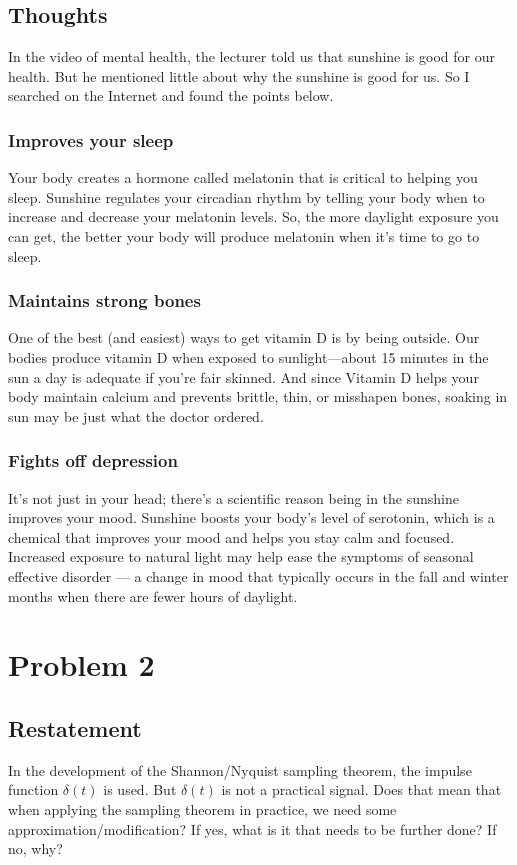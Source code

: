 \documentclass{article}
\begin{document}
\subsection{Thoughts}

In the video of mental health, the lecturer told us that sunshine is good for
our health. But he mentioned little about why the sunshine is good for us. So
I searched on the Internet and found the points below.

\subsubsection*{Improves your sleep}

Your body creates a hormone called melatonin that is critical to helping you
sleep. Sunshine regulates your circadian rhythm by telling your body when to
increase and decrease your melatonin levels. So, the more daylight exposure
you can get, the better your body will produce melatonin when it's time to go
to sleep.

\subsubsection*{Maintains strong bones} One of the best (and easiest) ways to
 get vitamin D is by being outside. Our bodies produce vitamin D when exposed
 to sunlight—about 15 minutes in the sun a day is adequate if you're fair
 skinned. And since Vitamin D helps your body maintain calcium and prevents
 brittle, thin, or misshapen bones, soaking in sun may be just what the
 doctor ordered.

\subsubsection*{Fights off depression} It's not just in your head; there's a
 scientific reason being in the sunshine improves your mood. Sunshine boosts
 your body's level of serotonin, which is a chemical that improves your mood
 and helps you stay calm and focused. Increased exposure to natural light may
 help ease the symptoms of seasonal effective disorder --- a change in mood
 that typically occurs in the fall and winter months when there are fewer
 hours of daylight.


\section{Problem 2}

\subsection{Restatement} In the development of the Shannon/Nyquist sampling
 theorem, the impulse function $\delta(t)$ is used. But $\delta (t)$ is not a
 practical signal. Does that mean that when applying the sampling theorem in
 practice, we need some approximation/modification? If yes, what is it that
 needs to be further done? If no, why?
\end{document}
